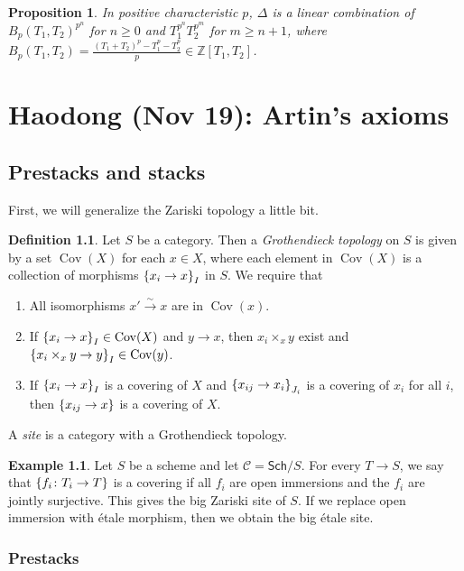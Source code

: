 \documentclass[leqno, openany]{memoir}
\newtheorem{prop}[thm]{Proposition}
\theoremstyle{definition}
\newtheorem{defn}[thm]{Definition}
\newtheorem{exm}[thm]{Example}
\theoremstyle{remark}
\theoremstyle{plain}
\theoremstyle{definition}
\theoremstyle{remark}
\newcommand{\Z}{\mathbb{Z}}
\newcommand{\mc}[1]{\mathcal{#1}}
\newcommand{\ms}[1]{\mathsf{#1}}
\newcommand{\on}[1]{\operatorname{#1}}
\begin{document}
\begin{prop}
    In positive characteristic $p$, $\Delta$ is a linear combination of $B_p(T_1, T_2)^{p^n}$ for $n \geq 0$ and $T_1^{p^n} T_2^{p^m}$ for $m \geq n+1$, where $B_p(T_1, T_2) = \frac{(T_1 + T_2)^p - T_1^p - T_2^p}{p} \in \Z[T_1, T_2]$.
\end{prop}

\chapter{Haodong (Nov 19): Artin's axioms}%
\label{cha:haodong_nov_19_artin_s_axioms}

\section{Prestacks and stacks}%
\label{sec:prestacks_and_stacks}

First, we will generalize the Zariski topology a little bit.
\begin{defn}
    Let $S$ be a category. Then a \textit{Grothendieck topology} on $S$ is given by a set $\on{Cov}(X)$ for each $x \in X$, where each element in $\on{Cov}(X)$ is a collection of morphisms $\qty{x_i \to x}_I$ in $S$. We require that
    \begin{enumerate}
        \item All isomorphisms $x' \xrightarrow{\sim} x$ are in $\on{Cov}(x)$.
        \item If $\qty{x_i \to x}_I \in \on{Cov}(X)$ and $y \to x$, then $x_i \times_x y$ exist and $\qty{x_i \times_x y \to y}_I \in \on{Cov}(y)$.
        \item If $\qty{x_i \to x}_I$ is a covering of $X$ and $\qty{x_{ij} \to x_i}_{J_i}$ is a covering of $x_i$ for all $i$, then $\qty{x_{ij} \to x}$ is a covering of $X$.
    \end{enumerate}
    A \textit{site} is a category with a Grothendieck topology.
\end{defn}

\begin{exm}
    Let $S$ be a scheme and let $\mc{C} = \ms{Sch}/S$. For every $T \to S$, we say that $\qty{f_i \colon T_i \to T}$ is a covering if all $f_i$ are open immersions and the $f_i$ are jointly surjective. This gives the big Zariski site of $S$. If we replace open immersion with \'etale morphism, then we obtain the big \'etale site.
\end{exm}

\subsection{Prestacks}%
\label{sub:prestacks}
\end{document}
